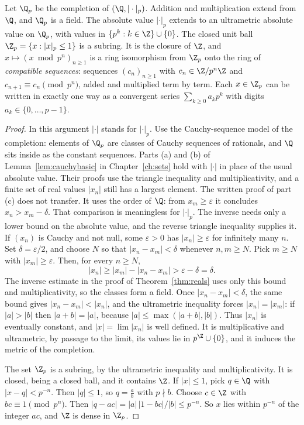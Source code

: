 \begin{theorem}\label{thm:Qp}
Let $\Q_p$ be the completion of $(\Q,|\cdot|_p)$. Addition and multiplication extend from $\Q$, and $\Q_p$ is a field. The absolute value $|\cdot|_p$ extends to an ultrametric absolute value on $\Q_p$, with values in $\{p^k:k\in\Z\}\cup\{0\}$. The closed unit ball $\Z_p=\{x:|x|_p\le1\}$ is a subring. It is the closure of $\Z$, and $x\mapsto(x\bmod p^n)_{n\ge1}$ is a ring isomorphism from $\Z_p$ onto the ring of \emph{compatible sequences}: sequences $(c_n)_{n\ge1}$ with $c_n\in\Z/p^n\Z$ and $c_{n+1}\equiv c_n\pmod{p^n}$, added and multiplied term by term. Each $x\in\Z_p$ can be written in exactly one way as a convergent series $\sum_{k\ge0}a_kp^k$ with digits $a_k\in\{0,\dots,p-1\}$.
\end{theorem}
\begin{proof}
In this argument $|\cdot|$ stands for $|\cdot|_p$. Use the Cauchy-sequence model of the completion: elements of $\Q_p$ are classes of Cauchy sequences of rationals, and $\Q$ sits inside as the constant sequences. Parts (a) and (b) of Lemma~\ref{lem:cauchybasic} in Chapter~\ref{ch:sets} hold with $|\cdot|$ in place of the usual absolute value. Their proofs use the triangle inequality and multiplicativity, and a finite set of real values $|x_n|$ still has a largest element. The written proof of part (c) does not transfer. It uses the order of $\Q$: from $x_m\ge\varepsilon$ it concludes $x_n>x_m-\delta$. That comparison is meaningless for $|\cdot|_p$. The inverse needs only a lower bound on the absolute value, and the reverse triangle inequality supplies it. If $(x_n)$ is Cauchy and not null, some $\varepsilon>0$ has $|x_n|\ge\varepsilon$ for infinitely many $n$. Set $\delta=\varepsilon/2$, and choose $N$ so that $|x_n-x_m|<\delta$ whenever $n,m\ge N$. Pick $m\ge N$ with $|x_m|\ge\varepsilon$. Then, for every $n\ge N$,
\[
|x_n|\ge|x_m|-|x_n-x_m|>\varepsilon-\delta=\delta.
\]
The inverse estimate in the proof of Theorem~\ref{thm:reals} uses only this bound and multiplicativity, so the classes form a field. Once $|x_n-x_m|<\delta$, the same bound gives $|x_n-x_m|<|x_n|$, and the ultrametric inequality forces $|x_n|=|x_m|$: if $|a|>|b|$ then $|a+b|=|a|$, because $|a|\le\max(|a+b|,|b|)$. Thus $|x_n|$ is eventually constant, and $|x|=\lim|x_n|$ is well defined. It is multiplicative and ultrametric, by passage to the limit, its values lie in $p^\Z\cup\{0\}$, and it induces the metric of the completion.

The set $\Z_p$ is a subring, by the ultrametric inequality and multiplicativity. It is closed, being a closed ball, and it contains $\Z$. If $|x|\le1$, pick $q\in\Q$ with $|x-q|<p^{-n}$. Then $|q|\le1$, so $q=\frac ab$ with $p\nmid b$. Choose $c\in\Z$ with $bc\equiv1\pmod{p^n}$. Then $|q-ac|=|a|\,|1-bc|/|b|\le p^{-n}$. So $x$ lies within $p^{-n}$ of the integer $ac$, and $\Z$ is dense in $\Z_p$.


\end{proof}
